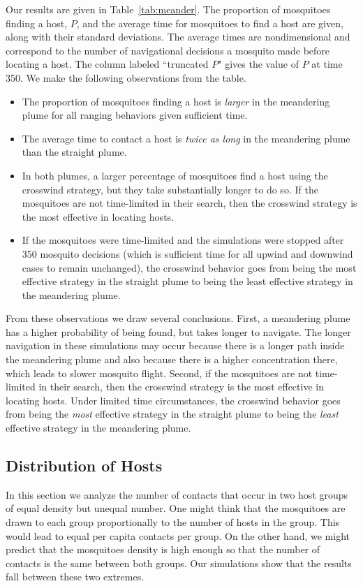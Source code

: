 \documentclass[12pt]{article}
\begin{document}
		Our results are given in Table~\ref{tab:meander}. The proportion of mosquitoes finding a host, $P$, and the average time for mosquitoes to find a host are given, along with their standard deviations. The average times are nondimensional and correspond to the number of navigational decisions a mosquito made before locating a host. The column labeled ``truncated $P$" gives the value of $P$ at time 350. We make the following observations from the table.
		\begin{itemize}
			\item The proportion of mosquitoes finding a host is \emph{larger} in the meandering plume for all ranging behaviors given sufficient time.
			\item The average time to contact a host is \emph{twice as long} in the meandering plume than the straight plume.
			\item In both plumes, a larger percentage of mosquitoes find a host using the crosswind strategy, but they take substantially longer to do so. If the mosquitoes are not time-limited in their search, then the crosswind strategy is the most effective in locating hosts.
			\item If the mosquitoes were time-limited and the simulations were stopped after 350 mosquito decisions (which is sufficient time for all upwind and downwind cases to remain unchanged), the crosswind behavior goes from being the most effective strategy in the straight plume to being the least effective strategy in the meandering plume.
		\end{itemize}
		
		From these observations we draw several conclusions.  First, a meandering plume has a higher probability of being found, but takes longer to navigate. The longer navigation in these simulations may occur because there is a longer path inside the meandering plume and also because there is a higher concentration there, which leads to slower mosquito flight. Second, if the mosquitoes are not time-limited in their search, then the crosswind strategy is the most effective in locating hosts.
			Under limited time circumstances, the crosswind behavior goes from being the \emph{most} effective strategy in the straight plume to being the \emph{least} effective strategy in the meandering plume.
		
\subsection{Distribution of Hosts}\label{sec:hostdist}
In this section we analyze the number of contacts that occur in two host groups of equal density but unequal number. One might think that the mosquitoes are drawn to each group proportionally to the number of hosts in the group. This would lead to equal per capita contacts per group. On the other hand, we might predict that the mosquitoes density is high enough so that the number of contacts is the same between both groups. Our simulations show that the results fall between these two extremes.
\end{document}
